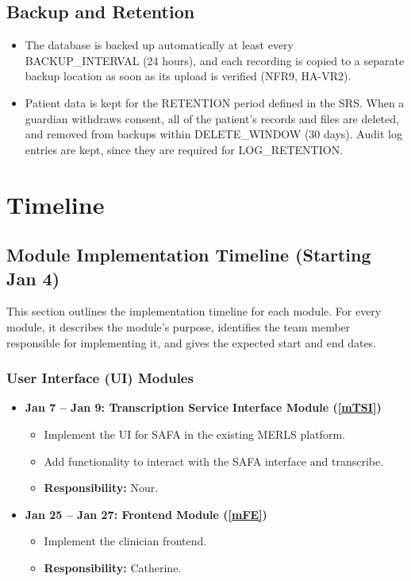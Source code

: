 \documentclass[12pt, titlepage]{article}
\begin{document}
\subsection{Backup and Retention}
\begin{itemize}
\item The database is backed up automatically at least every BACKUP\_INTERVAL (24 hours), and each recording is copied to a separate backup location as soon as its upload is verified (NFR9, HA-VR2).
\item Patient data is kept for the RETENTION period defined in the SRS. When a guardian withdraws consent, all of the patient's records and files are deleted, and removed from backups within DELETE\_WINDOW (30 days). Audit log entries are kept, since they are required for LOG\_RETENTION.
\end{itemize}

\section{Timeline}

\subsection{Module Implementation Timeline (Starting Jan 4)}
This section outlines the implementation timeline for each module. For every module, it describes the module's purpose, identifies the team member responsible for implementing it, and gives the expected start and end dates.

\subsubsection{User Interface (UI) Modules}
\begin{itemize}
    \item \textbf{Jan 7 -- Jan 9: Transcription Service Interface Module (\ref{mTSI})}
    \begin{itemize}
        \item Implement the UI for SAFA in the existing MERLS platform.
        \item Add functionality to interact with the SAFA interface and transcribe.
        \item \textbf{Responsibility:} Nour.
    \end{itemize}

    \item \textbf{Jan 25 -- Jan 27: Frontend Module (\ref{mFE})}
    \begin{itemize}
        \item Implement the clinician frontend.
        \item \textbf{Responsibility:} Catherine.
    \end{itemize}
\end{itemize}
\end{document}
